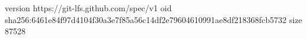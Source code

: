 version https://git-lfs.github.com/spec/v1
oid sha256:6461e84f97d4104f30a3e7f85a56c14df2e79604610991ae8df218368fcb5732
size 87528

